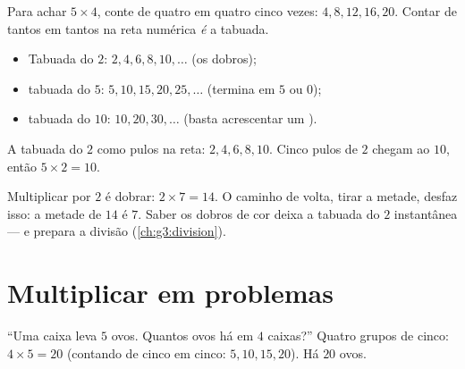 \begin{method}\label{met:g2:mult:skip}
Para achar $5 \times 4$, conte de quatro em quatro cinco vezes:
$4, 8, 12, 16, 20$. Contar de tantos em tantos na reta numérica
\emph{é} a tabuada.
\begin{itemize}
  \item Tabuada do $2$: $2, 4, 6, 8, 10, \dots$ (os dobros);
  \item tabuada do $5$: $5, 10, 15, 20, 25, \dots$ (termina em $5$ ou
        $0$);
  \item tabuada do $10$: $10, 20, 30, \dots$ (basta acrescentar um
        ).
\end{itemize}
\end{method}

\begin{omfigure}

{\small A tabuada do $2$ como pulos na reta: $2, 4, 6, 8, 10$. Cinco
pulos de $2$ chegam ao $10$, então $5 \times 2 = 10$.}
\end{omfigure}

\begin{example}\label{ex:g2:mult:double}
Multiplicar por $2$ é dobrar: $2 \times 7 = 14$. O caminho de volta,
tirar a metade, desfaz isso: a metade de $14$ é $7$. Saber os dobros
de cor deixa a tabuada do $2$ instantânea --- e prepara a divisão
(\cref{ch:g3:division}).
\end{example}

\section{Multiplicar em problemas}

\begin{example}\label{ex:g2:mult:problem}
``Uma caixa leva $5$ ovos. Quantos ovos há em $4$ caixas?'' Quatro
grupos de cinco: $4 \times 5 = 20$ (contando de cinco em cinco:
$5, 10, 15, 20$). Há $20$ ovos.
\end{example}

